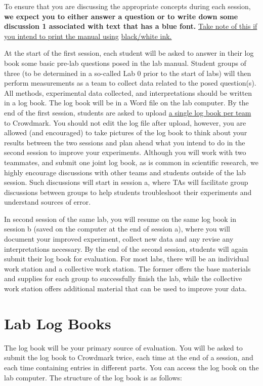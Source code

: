 \documentclass[12pt]{report}
\begin{document}
To ensure that you are discussing the appropriate concepts during each session, 
\textbf{ {\color{blue} we expect you to either answer a question or to write down some discussion 1 associated with text that has a blue font.}} \underline{Take note of this if you intend to print the manual using} \underline{black/white ink.}

At the start of the first session, each student will be asked to answer in their log book some basic pre-lab questions posed in the lab manual. Student groups of three (to be determined in a so-called Lab 0 prior to the start of labs) will then perform measurements as a team to collect data related to the posed question(s). 
All methods, experimental data collected, and interpretations should be written in a log book. 
The log book will be in a Word file on the lab computer. By the end of the first session, students are asked to upload \underline{a single log book per team} to Crowdmark. You should not edit the log file after upload, however, you are allowed (and encouraged) to take pictures of the log book to think about your results between the two sessions and plan ahead what you intend to do in the second session to improve your experiments. 
Although you will work with two teammates, and submit one joint log book, as is common in scientific research, we highly encourage discussions with other teams and students outside of the lab session. Such discussions will start in session a, where TAs will facilitate group discussions between groups to help students troubleshoot their experiments and understand sources of error. 

In second session of the same lab, you will resume on the same log book in session b (saved on the computer at the end of session a), where you will document your improved experiment, collect new data and any revise any interpretations necessary. 
By the end of the second session, students will again submit their log book for evaluation. For most labs, there will be an individual work station and a collective work station. The former offers the base materials and supplies for each group to successfully finish the lab, while the collective work station offers additional material that can be used to improve your data.

\section{Lab Log Books}
The log book will be your primary source of evaluation. You will be asked to submit the log book to Crowdmark twice, each time at the end of a session, and each time containing entries in different parts. You can access the log book on the lab computer. The structure of the log book is as follows:\\
 
\end{document}
